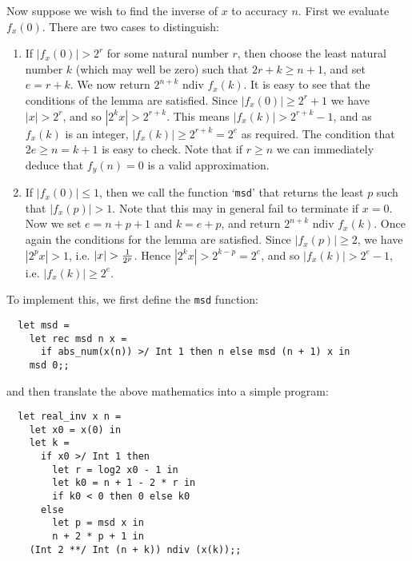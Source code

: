Now suppose we wish to find the inverse of $x$ to accuracy $n$. First we
evaluate $f_x(0)$. There are two cases to distinguish:

\begin{enumerate}

\item If $|f_x(0)| > 2^r$ for some natural number $r$, then choose the least
natural number $k$ (which may well be zero) such that $2 r + k \geq n + 1$, and
set $e = r + k$. We now return $2^{n+k} \mbox{ ndiv } f_x(k)$. It is easy to
see that the conditions of the lemma are satisfied. Since $|f_x(0)| \geq 2^r +
1$ we have $|x| > 2^r$, and so $|2^k x| > 2^{r + k}$. This means $|f_x(k)| >
2^{r+k} - 1$, and as $f_x(k)$ is an integer, $|f_x(k)| \geq 2^{r + k} = 2^e$ as
required. The condition that $2 e \geq n = k + 1$ is easy to check. Note that
if $r \geq n$ we can immediately deduce that $f_y(n) = 0$ is a valid
approximation.

\item If $|f_x(0)| \leq 1$, then we call the function `{\tt msd}' that returns
the least $p$ such that $|f_x(p)| > 1$. Note that this may in general fail to
terminate if $x = 0$. Now we set $e = n + p + 1$ and $k = e + p$, and return
$2^{n+k} \mbox{ ndiv } f_x(k)$. Once again the conditions for the lemma are
satisfied. Since $|f_x(p)| \geq 2$, we have $|2^p x| > 1$, i.e. $|x| > {1 \over
{2^p}}$. Hence $|2^k x| > 2^{k-p} = 2^e$, and so $|f_x(k)| > 2^e - 1$, i.e.
$|f_x(k)| \geq 2^e$.

\end{enumerate}

\noindent To implement this, we first define the {\tt msd} function:

\begin{boxed}\begin{lstlisting}
  let msd =
    let rec msd n x =
      if abs_num(x(n)) >/ Int 1 then n else msd (n + 1) x in
    msd 0;;
\end{lstlisting}\end{boxed}

\noindent and then translate the above mathematics into a simple program:

\begin{boxed}\begin{lstlisting}
  let real_inv x n =
    let x0 = x(0) in
    let k =
      if x0 >/ Int 1 then
        let r = log2 x0 - 1 in
        let k0 = n + 1 - 2 * r in
        if k0 < 0 then 0 else k0
      else
        let p = msd x in
        n + 2 * p + 1 in
    (Int 2 **/ Int (n + k)) ndiv (x(k));;
\end{lstlisting}\end{boxed}

